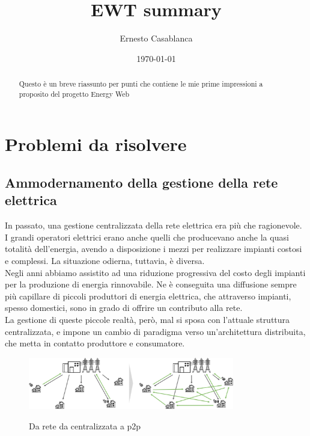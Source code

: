 \documentclass[12pt, letterpaper, twoside]{article}
\title{EWT summary}
\author{Ernesto Casablanca}
\date{\today}
\begin{document}

\tableofcontents

\newpage

\begin{abstract}
    Questo è un breve riassunto per punti che contiene le mie prime impressioni
    a proposito del progetto Energy Web
\end{abstract}

\section{Problemi da risolvere}

\subsection{Ammodernamento della gestione della rete elettrica}
In passato, una gestione centralizzata della rete elettrica era più che ragionevole.
I grandi operatori elettrici erano anche quelli che producevano anche la quasi totalità dell'energia, avendo a disposizione i mezzi per realizzare impianti costosi e complessi.
La situazione odierna, tuttavia, è diversa.\\
Negli anni abbiamo assistito ad una riduzione progressiva del costo degli impianti per la produzione di energia rinnovabile.
Ne è conseguita una diffusione sempre più capillare di piccoli produttori di energia elettrica, che attraverso impianti, spesso domestici, sono in grado di offrire un contributo alla rete.\\
La gestione di queste piccole realtà, però, mal si sposa con l'attuale struttura centralizzata, e impone un cambio di paradigma verso un'architettura distribuita, che metta in contatto produttore e consumatore.

\begin{figure}[h]
    \includegraphics[width=9cm]{p2pgrid}
    \centering
    \label{p2pgrid}
    \caption{Da rete da centralizzata a p2p \cite{img:p2pgrid}}
\end{figure}
\end{document}

